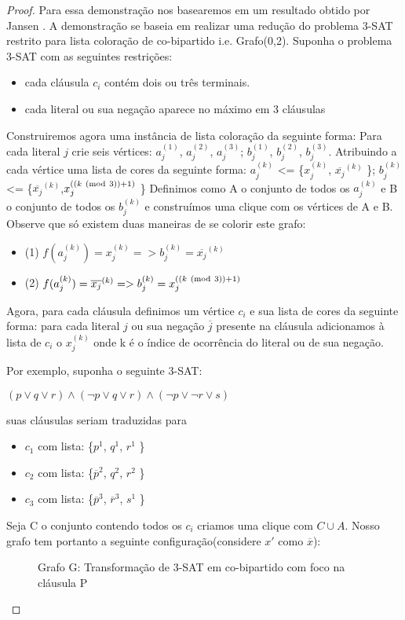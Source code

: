 \begin{proof}
		Para essa demonstração nos basearemos em um resultado obtido por Jansen \cite{jansen1999}. A demonstração se baseia em realizar uma redução do problema 3-SAT restrito para lista coloração de co-bipartido i.e. Grafo(0,2).
		Suponha o problema 3-SAT com as seguintes restrições:
		\begin{itemize}
			\item cada cláusula $c_i$ contém dois ou três terminais.
			\item cada literal ou sua negação aparece no máximo em 3 cláusulas
		\end{itemize}
		Construiremos agora uma instância de lista coloração da seguinte forma:\newline
		Para cada literal $j$ crie seis vértices:
		$a_j^{(1)}$, $a_j^{(2)}$, $a_j^{(3)}$;
		$b_j^{(1)}$, $b_j^{(2)}$, $b_j^{(3)}$. Atribuindo a cada vértice uma lista de cores da seguinte forma:\newline
		$a_j^{(k)}$ <= \{$x_j^{(k)}$, $\overline{x_j}^{(k)}$ \}; $b_j^{(k)}$ <= \{$\overline{x_j}^{(k)}$,$x_j^{((k \ (\mathrm{mod}\ 3)) + 1 )}$ \}\newline
		Definimos como A o conjunto de todos os $a_j^{(k)}$ e B o conjunto de todos os $b_j^{(k)}$ e construímos uma clique com os vértices de A e B. Observe que só existem duas maneiras de se colorir este grafo:
		\begin{itemize}
			\item (1)  $f(a_j^{(k)}) = x_j^{(k)} => b_j^{(k)} = \overline{x_j}^{(k)}$
			\item (2)  $f(a_j^{(k)}) = \overline{x_j}^{(k)} => b_j^{(k)} = x_j^{((k \ (\mathrm{mod}\ 3)) + 1 )}$
		\end{itemize}
		Agora, para cada cláusula definimos um vértice $c_i$ e sua lista de cores da seguinte forma: para cada literal $j$ ou sua negação $\overline{j}$ presente na cláusula adicionamos à lista de $c_i$ o $x_j^{(k)}$ onde k é o índice de ocorrência do literal ou de sua negação.
		
		Por exemplo, suponha o seguinte 3-SAT:
		
		$(p \lor q \lor r) \land (\neg{p} \lor q \lor r) \land (\neg{p} \lor \neg{r} \lor s)$
		
		suas cláusulas seriam traduzidas para
		\begin{itemize}
			\item $c_1$ com lista: \{$p^1$, $q^1$, $r^1$ \}
			\item $c_2$ com lista: \{$\overline{p}^2$, $q^2$, $r^2$ \}
			\item $c_3$ com lista: \{$\overline{p}^3$, $\overline{r}^3$, $s^1$ \}
		\end{itemize}
		Seja C o conjunto contendo todos os $c_i$ criamos uma clique com $C \cup A$.
		Nosso grafo tem portanto a seguinte configuração(considere $x'$ como $\overline{x}$):
		\begin{figure}[!ht]
			\centering
			
			\caption{Grafo G: Transformação de 3-SAT em co-bipartido com foco na cláusula P }
		\end{figure}
		

\end{proof}
